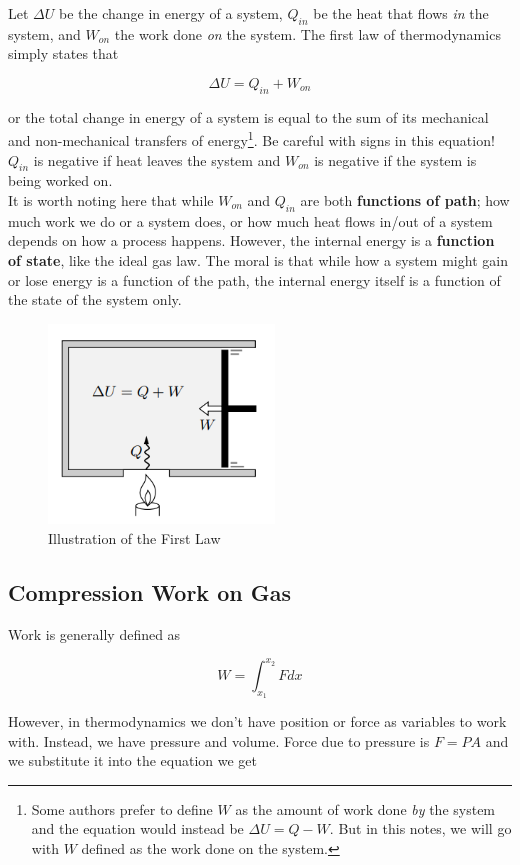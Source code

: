 Let $\Delta U$ be the change in energy of a system, $Q_{in}$ be the heat that flows \textit{in} the system, and $W_{on}$ the work done \textit{on} the system. The first law of thermodynamics simply states that

\[ \Delta U=Q_{in}+W_{on} \]

or the total change in energy of a system is equal to the sum of its mechanical and non-mechanical transfers of energy\footnote{Some authors prefer to define $W$ as the amount of work done \textit{by} the system and the equation would instead be \( \Delta U=Q-W \). But in this notes, we will go with $W$ defined as the work done on the system.}. Be careful with signs in this equation! $Q_{in}$ is negative if heat leaves the system and $W_{on}$ is negative if the system is being worked on. \\

It is worth noting here that while $W_{on}$ and $Q_{in}$ are both \textbf{functions of path}; how much work we do or a system does, or how much heat flows in/out of a system depends on how a process happens. However, the internal energy is a \textbf{function of state}, like the ideal gas law. The moral is that while how a system might gain or lose energy is a function of the path, the internal energy itself is a function of the state of the system only.

\begin{figure}[H]
	\centering
	\includegraphics[width=60mm]{23.png}
	\caption{Illustration of the First Law}
\end{figure}

\subsection{Compression Work on Gas}

Work is generally defined as

$$W = \int_{x_1}^{x_2} Fdx$$

However, in thermodynamics we don't have position or force as variables to work with. Instead, we have pressure and volume. Force due to pressure is $F = PA$ and we substitute it into the equation we get

